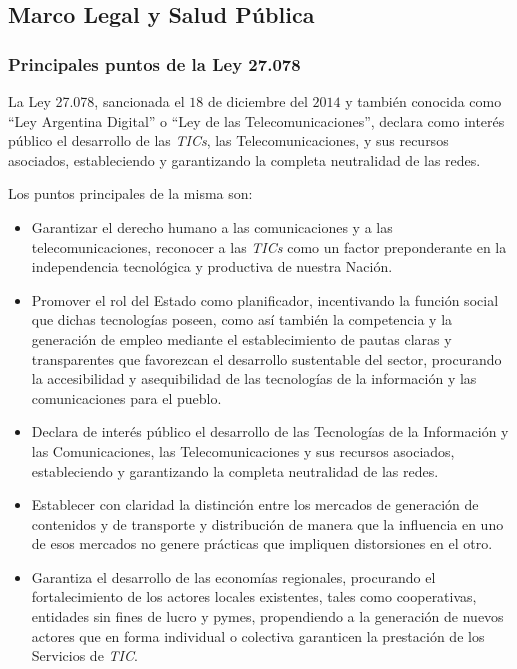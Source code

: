 \documentclass[12pt]{article}
\begin{document}
\subsection{Marco Legal y Salud Pública}
\label{sec_2.4}
\subsubsection{Principales puntos de la Ley 27.078}
\label{sec_2.4.1}
La Ley 27.078, sancionada el $18$ de diciembre del $2014$ y también conocida como  ``Ley Argentina Digital'' o ``Ley de las Telecomunicaciones'', declara como interés público el desarrollo de las \textit{TICs}, las Telecomunicaciones, y sus recursos asociados, estableciendo y garantizando la completa neutralidad de las redes. \cite[p. 21]{b1}

Los puntos principales de la misma son:
\begin{itemize}
    \item Garantizar el derecho humano a las comunicaciones y a las telecomunicaciones, reconocer a las \textit{TICs} como un factor preponderante en la independencia tecnológica y productiva de nuestra Nación.

    \item Promover el rol del Estado como planificador, incentivando la función social que dichas tecnologías poseen, como así también la competencia y la generación de empleo mediante el establecimiento de pautas claras y transparentes que favorezcan el desarrollo sustentable del sector, procurando la accesibilidad y asequibilidad de las tecnologías de la información y las comunicaciones para el pueblo.

    \item Declara de interés público el desarrollo de las Tecnologías de la Información y las Comunicaciones, las Telecomunicaciones y sus recursos asociados, estableciendo y garantizando la completa neutralidad de las redes.

    \item Establecer con claridad la distinción entre los mercados de generación de contenidos y de transporte y distribución de manera que la influencia en uno de esos mercados no genere prácticas que impliquen distorsiones en el otro.

    \item Garantiza el desarrollo de las economías regionales, procurando el fortalecimiento de los actores locales existentes, tales como cooperativas, entidades sin fines de lucro y pymes, propendiendo a la generación de nuevos actores que en forma individual o colectiva garanticen la prestación de los Servicios de \textit{TIC}.
\end{itemize}
\end{document}
